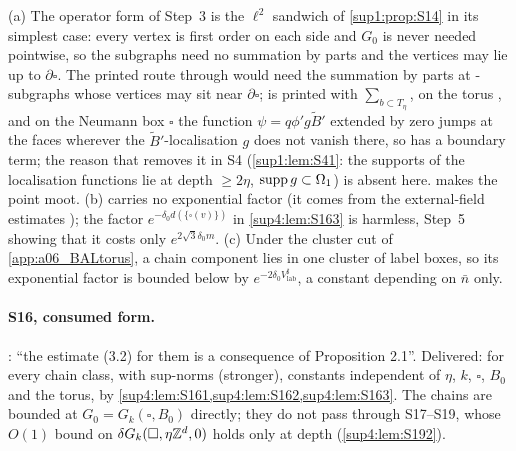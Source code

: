 \begin{remark}\label{sup4:rem:S16}
(a) The operator form of Step~3 is the $\ell^2$ sandwich of \cref{sup1:prop:S14} in its simplest case: every vertex is first order on each side and $G_0$ is never needed pointwise, so the subgraphs \cite[(2.4)]{Ba3} need no summation by parts and the vertices may lie up to $\partial\square$. The printed route through \cite[Prop.~2.1]{Ba3} would need the summation by parts \cite[(2.8)]{Ba3} at \cite[(2.4)]{Ba3}-subgraphs whose vertices may sit near $\partial\square$; \cite[(2.8)]{Ba3} is printed with $\sum_{b\subset T_\eta}$, on the torus \cite[p.~425]{Ba3}, and on the Neumann box $\square$ the function $\psi=q\phi'g\tilde B'$ extended by zero jumps at the faces wherever the $\tilde B'$-localisation $g$ does not vanish there, so \cite[(2.8)]{Ba3} has a boundary term; the reason that removes it in S4 (\cref{sup1:lem:S41}: the supports of the localisation functions lie at depth $\ge2\eta$, $\operatorname{supp} g\subset\Omega_1$) is absent here.  makes the point moot. (b) \cite[(3.2)]{Ba3} carries no exponential factor (it comes from the external-field estimates \cite[(2.5), (3.1)]{Ba3}); the factor $e^{-\delta_0d(\{\square(v)\})}$ in \cref{sup4:lem:S163} is harmless, Step~5 showing that it costs only $e^{2\sqrt3\delta_0m}$. (c) Under the cluster cut of \cref{app:a06_BALtorus}, a chain component lies in one cluster of label boxes, so its exponential factor is bounded below by $e^{-2\delta_0V^\sharp_{\mathrm{lab}}}$, a constant depending on $\bar n$ only.
\end{remark}

\paragraph{S16, consumed form.} \cite[p.~433]{Ba3}: ``the estimate (3.2) for them is a consequence of Proposition 2.1''. Delivered: \cite[(3.2)]{Ba3} for every chain class, with sup-norms (stronger), constants independent of $\eta$, $k$, $\square$, $B_0$ and the torus, by \cref{sup4:lem:S161,sup4:lem:S162,sup4:lem:S163}. The chains are bounded at $G_0=G_k(\square,B_0)$ directly; they do not pass through S17--S19, whose $O(1)$ bound on $\delta G_k(\square,\eta\mathbb Z^d,0)$ holds only at depth (\cref{sup4:lem:S192}).
